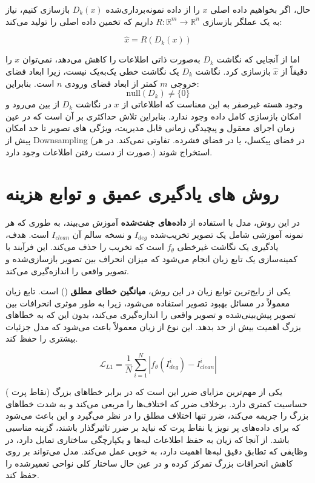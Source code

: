 حال، اگر بخواهیم داده اصلی \( x \) را از داده نمونه‌برداری‌شده \( D_k(x) \) بازسازی کنیم، نیاز به یک عملگر بازسازی \( R: \mathbb{R}^m \to \mathbb{R}^n \) داریم که تخمین داده اصلی را تولید می‌کند:

\[
\hat{x} = R(D_k(x))
\]

اما از آنجایی که نگاشت \( D_k \) به‌صورت ذاتی اطلاعات را کاهش می‌دهد، نمی‌توان \( x \) را دقیقاً از \( \hat{x} \) بازسازی کرد. نگاشت \( D_k \) یک نگاشت خطی یک‌به‌یک نیست، زیرا ابعاد فضای خروجی \( m \) کمتر از ابعاد فضای ورودی \( n \) است. بنابراین:
\[
\text{null}(D_k) \neq \{0\}
\]
وجود هسته غیرصفر به این معناست که اطلاعاتی از \( x \) در نگاشت \( D_k \) از بین می‌رود و امکان بازسازی کامل داده وجود ندارد. بنابراین تلاش حداکثری بر آن است که در عین زمان اجرای معقول و پیچیدگی زمانی قابل مدیریت، ویژگی های تصویر تا حد امکان پیش از Downsampling (در فضای پیکسل، یا در فضای فشرده. تفاوتی نمی‌کند. در هر صورت از دست رفتن اطلاعات وجود دارد.) استخراج شوند.





\section{روش های یادگیری عمیق و توابع هزینه}


در این روش، مدل با استفاده از \textbf{داده‌های جفت‌شده} آموزش می‌بیند، به طوری که هر نمونه آموزشی شامل یک تصویر تخریب‌شده $ I_{deg} $ و نسخه سالم آن $ I_{clean} $  است. هدف، یادگیری یک نگاشت غیرخطی $ f_{\theta} $  است که تخریب را حذف می‌کند. این فرآیند با کمینه‌سازی یک تابع زیان انجام می‌شود
که میزان انحراف بین تصویر بازسازی‌شده و تصویر واقعی را اندازه‌گیری می‌کند.


یکی از رایج‌ترین توابع زیان در این روش، \textbf{میانگین خطای مطلق}
()
است. تابع زیان  معمولاً در مسائل بهبود تصویر استفاده می‌شود، زیرا به طور موثری انحرافات بین تصویر پیش‌بینی‌شده و تصویر واقعی را اندازه‌گیری می‌کند، بدون این که به خطاهای بزرگ اهمیت بیش از حد بدهد. این نوع از زیان معمولاً باعث می‌شود که مدل جزئیات بیشتری را حفظ کند.

$$
\mathcal{L}_{L1} = \frac{1}{N} \sum_{i=1}^{N} |f_{\theta}(I_{deg}^i) - I_{clean}^i|
$$ 

 یکی از مهم‌ترین مزایای ضرر  این است که در برابر خطاهای بزرگ (نقاط پرت
 )
حساسیت کمتری دارد. برخلاف ضرر  که اختلاف‌ها را مربعی می‌کند و به شدت خطاهای بزرگ را جریمه می‌کند، ضرر  تنها اختلاف مطلق را در نظر می‌گیرد و این باعث می‌شود که برای داده‌های پر نویز یا نقاط پرت که نباید بر ضرر تاثیرگذار باشند، گزینه مناسبی باشد. از آنجا که زیان  به حفظ اطلاعات لبه‌ها و یکپارچگی ساختاری تمایل دارد، در وظایفی که تطابق دقیق لبه‌ها اهمیت دارد، به خوبی عمل می‌کند. مدل می‌تواند بر روی کاهش انحرافات بزرگ تمرکز کرده و در عین حال ساختار کلی نواحی تعمیرشده را حفظ کند.

